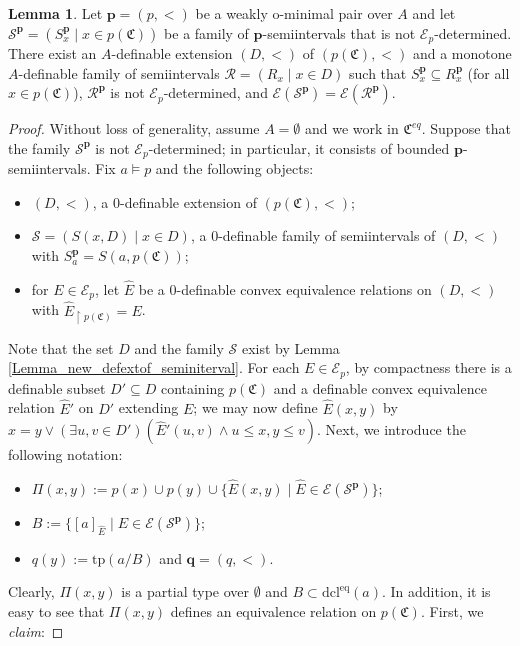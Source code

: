 \documentclass{amsart}
\theoremstyle{definition}
\newtheorem{Lemma}[Theorem]{Lemma}
\theoremstyle{definition}
\def\strok{\restriction}
\newcommand{\Mon}{\mathfrak C}
\newcommand{\Moneq}{\mathfrak C^{eq}}
\newcommand{\tp}{\mathrm{tp}}
\newcommand{\dcleq}{\mathrm{dcl^{eq}}}
\def\pp{\mathbf{p}}
\begin{document}
\begin{Lemma}\label{Lemma_notEdetermined_implies_exists_p_monotone}
Let $\mathbf p=(p,<)$ be a weakly o-minimal pair over $A$ and let $\mathcal S^{\mathbf p}=(S^\pp_x\mid x\in p(\Mon))$ be a family of $\mathbf p$-semiintervals that is not $\mathcal E_p$-determined. There exist an $A$-definable extension $(D,<)$ of $(p(\Mon),<)$ and a monotone $A$-definable family of semiintervals $\mathcal R=(R_x\mid x\in D)$ such that $S_x^{\mathbf p}\subseteq R^{\mathbf p}_x$ (for all $x\in p(\Mon)$), $\mathcal R^{\mathbf p}$ is not $\mathcal E_p$-determined, and $\mathcal E(\mathcal S^{\mathbf p})=\mathcal E(\mathcal R^{\mathbf p})$. 
\end{Lemma}
\begin{proof}
 Without loss of generality, assume $A=\emptyset$ and we work in $\Moneq$. Suppose that the family $\mathcal S^{\mathbf p}$  is not $\mathcal E_p$-determined; in particular, it consists of bounded $\mathbf p$-semiintervals. Fix $a\models 
 p$ and the following objects:
\begin{itemize}
    \item $(D,<)$, a $0$-definable extension of $(p(\Mon),<)$;
    \item $\mathcal S=(S(x,D)\mid x\in D)$, a $0$-definable family of semiintervals of $(D,<)$ with $S^{\mathbf p}_a=S(a,p(\Mon))$; 
    \item for $E\in \mathcal E_p$, let $\hat E$ be a $0$-definable convex equivalence relations on $(D,<)$ with $\hat E_{\strok p(\Mon)}=E$.
\end{itemize}
Note that the set $D$ and the family $\mathcal S$ exist by Lemma \ref{Lemma_new_defextof_seminiterval}. For each $E\in\mathcal E_p$, by compactness there is a definable subset $D'\subseteq D$ containing $p(\Mon)$ and a definable convex equivalence relation $\hat E'$ on $D'$ extending $E$; we may now define $\hat E(x,y)$ by $x=y\lor (\exists u,v\in D')(\hat E'(u,v)\land u\leqslant x,y\leqslant v)$.
Next, we introduce the following notation:
\begin{itemize}
    \item $\Pi(x,y):=p(x)\cup p(y)\cup\{\hat E(x,y)\mid \hat E\in \mathcal E(\mathcal S^{\mathbf p})\}$;
    \item $B:=\{[a]_{\hat E}\mid E\in\mathcal E(\mathcal S^{\mathbf p})\}$;   \item $q(y):= \tp(a/B)$ and $\mathbf q=(q,<)$.
\end{itemize}
Clearly, $\Pi(x,y)$ is a partial type over $\emptyset$ and $B\subset \dcleq(a)$. In addition, it is easy to see that $\Pi(x,y)$ defines an equivalence relation on $p(\Mon)$. First, we {\em claim}:

\end{proof}
\end{document}
